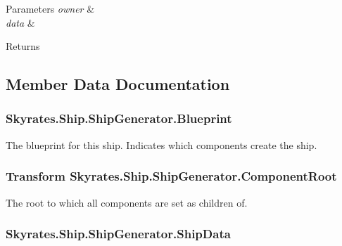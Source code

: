 \begin{DoxyParams}{Parameters}
{\em owner} & \\
\hline
{\em data} & \\
\hline
\end{DoxyParams}
\begin{DoxyReturn}{Returns}

\end{DoxyReturn}


\subsection{Member Data Documentation}
\hypertarget{class_skyrates_1_1_ship_1_1_ship_generator_a97b0d9ba683bd4ea383f01ef96348d5a}{
\subsubsection[{Blueprint}]{ Skyrates.\-Ship.\-Ship\-Generator.\-Blueprint}}\label{class_skyrates_1_1_ship_1_1_ship_generator_a97b0d9ba683bd4ea383f01ef96348d5a}


The blueprint for this ship. Indicates which components create the ship. 

\hypertarget{class_skyrates_1_1_ship_1_1_ship_generator_a040b9432f06173ddce445b14fdd42c9a}{
\subsubsection[{Component\-Root}]{\setlength{\rightskip}{0pt plus 5cm}Transform Skyrates.\-Ship.\-Ship\-Generator.\-Component\-Root}}\label{class_skyrates_1_1_ship_1_1_ship_generator_a040b9432f06173ddce445b14fdd42c9a}


The root to which all components are set as children of. 

\hypertarget{class_skyrates_1_1_ship_1_1_ship_generator_ad8e9cf776a0b91cf123a9faa0c13cedf}{
\subsubsection[{Ship\-Data}]{ Skyrates.\-Ship.\-Ship\-Generator.\-Ship\-Data}}\label{class_skyrates_1_1_ship_1_1_ship_generator_ad8e9cf776a0b91cf123a9faa0c13cedf}


